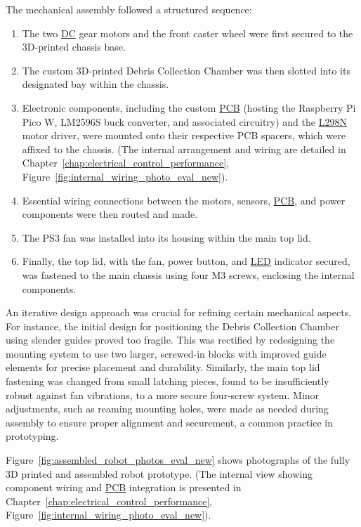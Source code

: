 The mechanical assembly followed a structured sequence:
\begin{enumerate}
    \item The two \hyperref[term:dc]{DC} gear motors and the front caster wheel were first secured to the 3D-printed chassis base.
    \item The custom 3D-printed Debris Collection Chamber was then slotted into its designated bay within the chassis.
    \item Electronic components, including the custom \hyperref[term:pcb]{PCB} (hosting the Raspberry Pi Pico W, LM2596S buck converter, and associated circuitry) and the \hyperref[term:l298n]{L298N} motor driver, were mounted onto their respective PCB spacers, which were affixed to the chassis. (The internal arrangement and wiring are detailed in Chapter~\ref{chap:electrical_control_performance}, Figure~\ref{fig:internal_wiring_photo_eval_new}).
    \item Essential wiring connections between the motors, sensors, \hyperref[term:pcb]{PCB}, and power components were then routed and made.
    \item The PS3 fan was installed into its housing within the main top lid.
    \item Finally, the top lid, with the fan, power button, and \hyperref[term:led]{LED} indicator secured, was fastened to the main chassis using four M3 screws, enclosing the internal components.
\end{enumerate}
An iterative design approach was crucial for refining certain mechanical aspects. For instance, the initial design for positioning the Debris Collection Chamber using slender guides proved too fragile. This was rectified by redesigning the mounting system to use two larger, screwed-in blocks with improved guide elements for precise placement and durability. Similarly, the main top lid fastening was changed from small latching pieces, found to be insufficiently robust against fan vibrations, to a more secure four-screw system. Minor adjustments, such as reaming mounting holes, were made as needed during assembly to ensure proper alignment and securement, a common practice in prototyping.

Figure~\ref{fig:assembled_robot_photos_eval_new} shows photographs of the fully 3D printed and assembled robot prototype. (The internal view showing component wiring and \hyperref[term:pcb]{PCB} integration is presented in Chapter~\ref{chap:electrical_control_performance}, Figure~\ref{fig:internal_wiring_photo_eval_new}).

